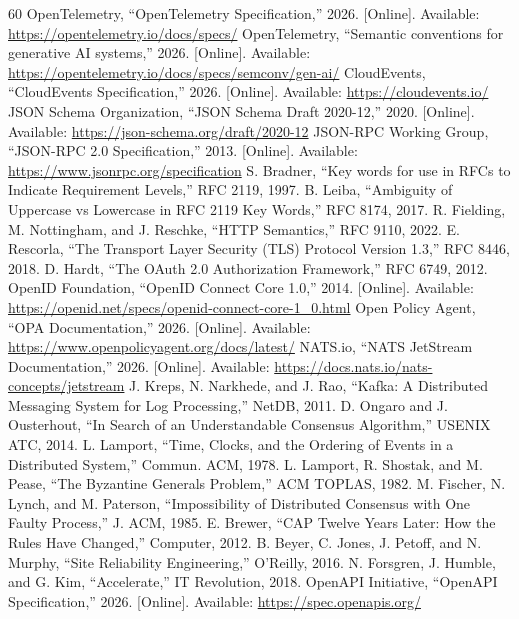 \documentclass[12pt,journal,onecolumn,draftclsnofoot]{IEEEtran}
\begin{document}
\begin{thebibliography}{60}
 OpenTelemetry, ``OpenTelemetry Specification,'' 2026. [Online]. Available: \url{https://opentelemetry.io/docs/specs/}
 OpenTelemetry, ``Semantic conventions for generative AI systems,'' 2026. [Online]. Available: \url{https://opentelemetry.io/docs/specs/semconv/gen-ai/}
 CloudEvents, ``CloudEvents Specification,'' 2026. [Online]. Available: \url{https://cloudevents.io/}
 JSON Schema Organization, ``JSON Schema Draft 2020-12,'' 2020. [Online]. Available: \url{https://json-schema.org/draft/2020-12}
 JSON-RPC Working Group, ``JSON-RPC 2.0 Specification,'' 2013. [Online]. Available: \url{https://www.jsonrpc.org/specification}
 S. Bradner, ``Key words for use in RFCs to Indicate Requirement Levels,'' RFC 2119, 1997.
 B. Leiba, ``Ambiguity of Uppercase vs Lowercase in RFC 2119 Key Words,'' RFC 8174, 2017.
 R. Fielding, M. Nottingham, and J. Reschke, ``HTTP Semantics,'' RFC 9110, 2022.
 E. Rescorla, ``The Transport Layer Security (TLS) Protocol Version 1.3,'' RFC 8446, 2018.
 D. Hardt, ``The OAuth 2.0 Authorization Framework,'' RFC 6749, 2012.
 OpenID Foundation, ``OpenID Connect Core 1.0,'' 2014. [Online]. Available: \url{https://openid.net/specs/openid-connect-core-1_0.html}
 Open Policy Agent, ``OPA Documentation,'' 2026. [Online]. Available: \url{https://www.openpolicyagent.org/docs/latest/}
 NATS.io, ``NATS JetStream Documentation,'' 2026. [Online]. Available: \url{https://docs.nats.io/nats-concepts/jetstream}
 J. Kreps, N. Narkhede, and J. Rao, ``Kafka: A Distributed Messaging System for Log Processing,'' NetDB, 2011.
 D. Ongaro and J. Ousterhout, ``In Search of an Understandable Consensus Algorithm,'' USENIX ATC, 2014.
 L. Lamport, ``Time, Clocks, and the Ordering of Events in a Distributed System,'' Commun. ACM, 1978.
 L. Lamport, R. Shostak, and M. Pease, ``The Byzantine Generals Problem,'' ACM TOPLAS, 1982.
 M. Fischer, N. Lynch, and M. Paterson, ``Impossibility of Distributed Consensus with One Faulty Process,'' J. ACM, 1985.
 E. Brewer, ``CAP Twelve Years Later: How the Rules Have Changed,'' Computer, 2012.
 B. Beyer, C. Jones, J. Petoff, and N. Murphy, ``Site Reliability Engineering,'' O'Reilly, 2016.
 N. Forsgren, J. Humble, and G. Kim, ``Accelerate,'' IT Revolution, 2018.
 OpenAPI Initiative, ``OpenAPI Specification,'' 2026. [Online]. Available: \url{https://spec.openapis.org/}

\end{thebibliography}
\end{document}
